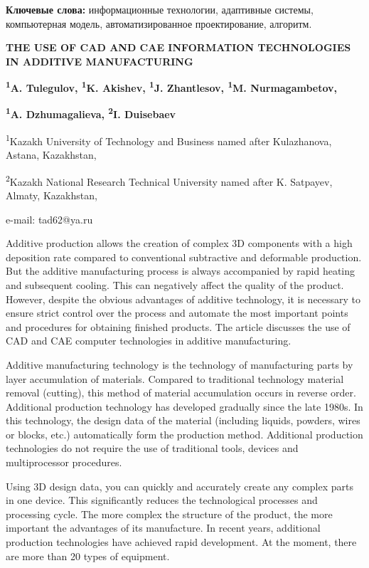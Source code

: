 {\bfseries Ключевые слова:} информационные технологии, адаптивные системы,
компьютерная модель, автоматизированное проектирование, алгоритм.

{\bfseries THE USE OF CAD AND CAE INFORMATION TECHNOLOGIES IN ADDITIVE
MANUFACTURING}

{\bfseries \textsuperscript{1}A. Tulegulov\textsuperscript{\envelope },
\textsuperscript{1}K. Akishev, \textsuperscript{1}J. Zhantlesov,
\textsuperscript{1}M. Nurmagambetov,}

{\bfseries \textsuperscript{1}A. Dzhumagalieva, \textsuperscript{2}I.
Duisebaev}

\textsuperscript{1}Kazakh University of Technology and Business named
after Kulazhanova, Astana, Kazakhstan,

\textsuperscript{2}Kazakh National Research Technical University named
after K. Satpayev, Almaty, Kazakhstan,

e-mail: tad62@ya.ru

Additive production allows the creation of complex 3D components with a
high deposition rate compared to conventional subtractive and deformable
production. But the additive manufacturing process is always accompanied
by rapid heating and subsequent cooling. This can negatively affect the
quality of the product. However, despite the obvious advantages of
additive technology, it is necessary to ensure strict control over the
process and automate the most important points and procedures for
obtaining finished products. The article discusses the use of CAD and
CAE computer technologies in additive manufacturing.

Additive manufacturing technology is the technology of manufacturing
parts by layer accumulation of materials. Compared to traditional
technology material removal (cutting), this method of material
accumulation occurs in reverse order. Additional production technology
has developed gradually since the late 1980s. In this technology, the
design data of the material (including liquids, powders, wires or
blocks, etc.) automatically form the production method. Additional
production technologies do not require the use of traditional tools,
devices and multiprocessor procedures.

Using 3D design data, you can quickly and accurately create any complex
parts in one device. This significantly reduces the technological
processes and processing cycle. The more complex the structure of the
product, the more important the advantages of its manufacture. In recent
years, additional production technologies have achieved rapid
development. At the moment, there are more than 20 types of equipment.

